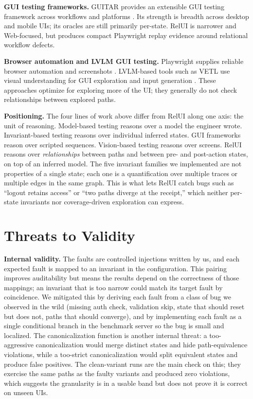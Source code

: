 \documentclass[sigconf,nonacm]{acmart}
\newcommand{\RelUI}{RelUI\xspace}
\begin{document}
\textbf{GUI testing frameworks.} GUITAR provides an extensible GUI testing framework across workflows and platforms \citep{nguyen2013guitar}. Its strength is breadth across desktop and mobile UIs; its oracles are still primarily per-state. \RelUI is narrower and Web-focused, but produces compact Playwright replay evidence around relational workflow defects.

\textbf{Browser automation and LVLM GUI testing.} Playwright supplies reliable browser automation and screenshots \citep{playwright}. LVLM-based tools such as VETL use visual understanding for GUI exploration and input generation \citep{wang2024vetl}. These approaches optimize for exploring more of the UI; they generally do not check relationships between explored paths.

\textbf{Positioning.} The four lines of work above differ from \RelUI along one axis: the unit of reasoning. Model-based testing reasons over a model the engineer wrote. Invariant-based testing reasons over individual inferred states. GUI frameworks reason over scripted sequences. Vision-based testing reasons over screens. \RelUI reasons over \emph{relationships} between paths and between pre- and post-action states, on top of an inferred model. The five invariant families we implemented are not properties of a single state; each one is a quantification over multiple traces or multiple edges in the same graph. This is what lets \RelUI catch bugs such as ``logout retains access'' or ``two paths diverge at the receipt,'' which neither per-state invariants nor coverage-driven exploration can express.

\section{Threats to Validity}\label{sec:threats}
\textbf{Internal validity.} The faults are controlled injections written by us, and each expected fault is mapped to an invariant in the configuration. This pairing improves auditability but means the results depend on the correctness of those mappings; an invariant that is too narrow could match its target fault by coincidence. We mitigated this by deriving each fault from a class of bug we observed in the wild (missing auth check, validation skip, state that should reset but does not, paths that should converge), and by implementing each fault as a single conditional branch in the benchmark server so the bug is small and localized. The canonicalization function is another internal threat: a too-aggressive canonicalization would merge distinct states and hide path-equivalence violations, while a too-strict canonicalization would split equivalent states and produce false positives. The clean-variant runs are the main check on this; they exercise the same paths as the faulty variants and produced zero violations, which suggests the granularity is in a usable band but does not prove it is correct on unseen UIs.
\end{document}
